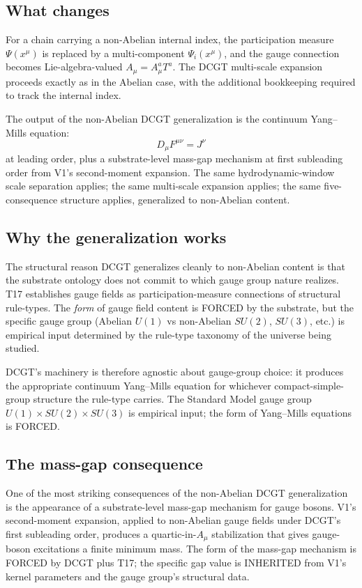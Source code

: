 \documentclass[11pt,a4paper]{article}
\begin{document}
\subsection{What changes}

For a chain carrying a non-Abelian internal index, the participation measure $\Psi(x^\mu)$ is replaced by a multi-component $\Psi_i(x^\mu)$, and the gauge connection becomes Lie-algebra-valued $A_\mu = A_\mu^a T^a$. The DCGT multi-scale expansion proceeds exactly as in the Abelian case, with the additional bookkeeping required to track the internal index.

The output of the non-Abelian DCGT generalization is the continuum Yang--Mills equation:
\[
D_\mu F^{\mu\nu} = J^\nu
\]
at leading order, plus a substrate-level mass-gap mechanism at first subleading order from V1's second-moment expansion. The same hydrodynamic-window scale separation applies; the same multi-scale expansion applies; the same five-consequence structure applies, generalized to non-Abelian content.

\subsection{Why the generalization works}

The structural reason DCGT generalizes cleanly to non-Abelian content is that the substrate ontology does not commit to which gauge group nature realizes. T17 establishes gauge fields as participation-measure connections of structural rule-types. The \emph{form} of gauge field content is FORCED by the substrate, but the specific gauge group (Abelian $U(1)$ vs non-Abelian $SU(2)$, $SU(3)$, etc.) is empirical input determined by the rule-type taxonomy of the universe being studied.

DCGT's machinery is therefore agnostic about gauge-group choice: it produces the appropriate continuum Yang--Mills equation for whichever compact-simple-group structure the rule-type carries. The Standard Model gauge group $U(1) \times SU(2) \times SU(3)$ is empirical input; the form of Yang--Mills equations is FORCED.

\subsection{The mass-gap consequence}

One of the most striking consequences of the non-Abelian DCGT generalization is the appearance of a substrate-level mass-gap mechanism for gauge bosons. V1's second-moment expansion, applied to non-Abelian gauge fields under DCGT's first subleading order, produces a quartic-in-$A_\mu$ stabilization that gives gauge-boson excitations a finite minimum mass. The form of the mass-gap mechanism is FORCED by DCGT plus T17; the specific gap value is INHERITED from V1's kernel parameters and the gauge group's structural data.
\end{document}
